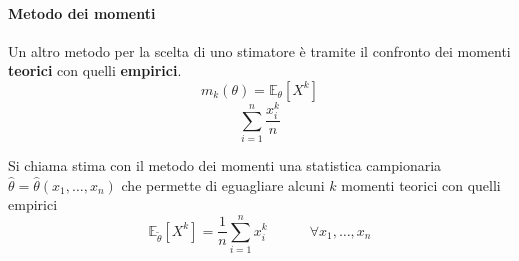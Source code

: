 \paragraph{Metodo dei momenti}
Un altro metodo per la scelta di uno stimatore è tramite il confronto dei momenti \textbf{teorici} con quelli \textbf{empirici}. 
\begin{equation*}
	m_k(\theta) = \mathbb{E}_\theta[X^k] \tag{Momenti teorici}
\end{equation*}
\begin{equation}
	\sum_{i=1}^{n} \frac{x_i^k}{n} \tag{Momenti empirici}
\end{equation}

\begin{definition}
	Si chiama stima con il metodo dei momenti una statistica campionaria $\hat{\theta}=\hat{\theta}(x_1, \ldots, x_n)$ che permette di eguagliare alcuni $k$ momenti teorici con quelli empirici
	\begin{equation}
		\mathbb{E}_{\tilde{\theta}}[X^k] = \frac{1}{n}\sum_{i=1}^{n}x^k_i \quad\quad\quad \forall x_1, \ldots, x_n
	\end{equation}
\end{definition}